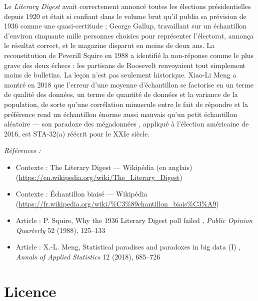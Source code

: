 \documentclass[11pt]{article}
\newenvironment{refs}{\par\small\noindent\emph{Références :}\begin{itemize}\setlength\itemsep{0pt}}{\end{itemize}\normalsize}
\begin{document}
\noindent Le \textit{Literary Digest} avait correctement annoncé toutes les élections
présidentielles depuis 1920 et était si confiant dans le volume brut qu'il publia sa prévision de
1936 comme une quasi-certitude ; George Gallup, travaillant sur un échantillon d'environ cinquante
mille personnes choisies pour représenter l'électorat, annonça le résultat correct, et le magazine
disparut en moins de deux ans. La reconstitution de Peverill Squire en 1988 a identifié la
non-réponse comme le plus grave des deux échecs : les partisans de Roosevelt renvoyaient tout
simplement moins de bulletins. La leçon n'est pas seulement historique. Xiao-Li Meng a montré en
2018 que l'erreur d'une moyenne d'échantillon se factorise en un terme de qualité des données, un
terme de quantité de données et la variance de la population, de sorte qu'une corrélation minuscule
entre le fait de répondre et la préférence rend un échantillon énorme aussi mauvais qu'un petit
échantillon aléatoire --- son \og{} paradoxe des mégadonnées \fg{}, appliqué à l'élection américaine de 2016,
est STA-32(a) réécrit pour le XXIe siècle.

\begin{refs}
\item Contexte : The Literary Digest --- Wikipédia (en anglais) (\url{https://en.wikipedia.org/wiki/The_Literary_Digest})
\item Contexte : Échantillon biaisé --- Wikipédia (\url{https://fr.wikipedia.org/wiki/%C3%89chantillon_biais%C3%A9})
\item Article : P. Squire, \og{} Why the 1936 Literary Digest poll failed \fg{}, \textit{Public Opinion Quarterly} 52 (1988), 125--133
\item Article : X.-L. Meng, \og{} Statistical paradises and paradoxes in big data (I) \fg{}, \textit{Annals of Applied Statistics} 12 (2018), 685--726
\end{refs}

\bigskip


\section*{Licence}
\end{document}
